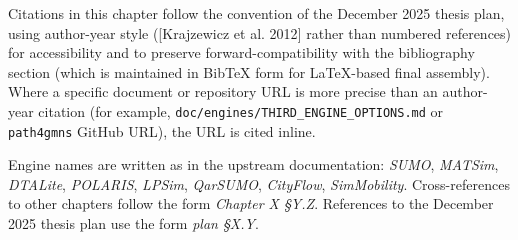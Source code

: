 Citations in this chapter follow the convention of the December 2025
thesis plan, using author-year style ({[}Krajzewicz et al. 2012{]}
rather than numbered references) for accessibility and to preserve
forward-compatibility with the bibliography section (which is maintained
in BibTeX form for LaTeX-based final assembly). Where a specific
document or repository URL is more precise than an author-year citation
(for example, \texttt{doc/engines/THIRD\_ENGINE\_OPTIONS.md} or
\texttt{path4gmns} GitHub URL), the URL is cited inline.

Engine names are written as in the upstream documentation: \emph{SUMO},
\emph{MATSim}, \emph{DTALite}, \emph{POLARIS}, \emph{LPSim},
\emph{QarSUMO}, \emph{CityFlow}, \emph{SimMobility}. Cross-references to
other chapters follow the form \emph{Chapter X §Y.Z}. References to the
December 2025 thesis plan use the form \emph{plan §X.Y}.
